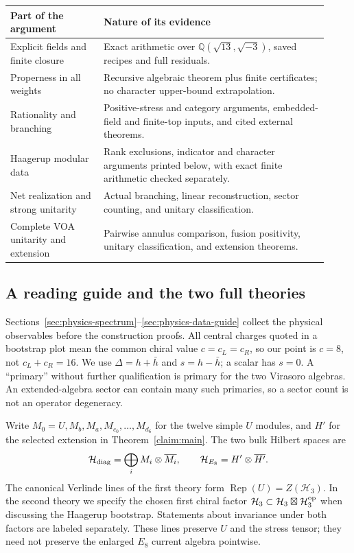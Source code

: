 \documentclass[11pt,a4paper]{article}
\theoremstyle{definition}
\DeclareMathOperator{\Rep}{Rep}
\newcommand{\HH}{\mathcal H}
\newcommand{\QQ}{\mathbb Q}
\begin{document}
\begin{center}
\begin{tabular}{@{}p{0.27\linewidth}p{0.65\linewidth}@{}}
\toprule
Part of the argument & Nature of its evidence \\
\midrule
Explicit fields and finite closure & Exact arithmetic over
\(\QQ(\sqrt{13},\sqrt{-3})\), saved recipes and full residuals.\\
Properness in all weights & Recursive algebraic theorem plus finite
certificates; no character upper-bound extrapolation.\\
Rationality and branching & Positive-stress and category arguments,
embedded-field and finite-top inputs, and cited external theorems.\\
Haagerup modular data & Rank exclusions, indicator and character
arguments printed below, with exact finite arithmetic checked separately.\\
Net realization and strong unitarity & Actual branching, linear
reconstruction, sector counting, and unitary classification.\\
Complete VOA unitarity and extension & Pairwise annulus comparison,
fusion positivity, unitary classification, and extension theorems.\\
\bottomrule
\end{tabular}
\end{center}

\subsection{A reading guide and the two full theories}
Sections~\ref{sec:physics-spectrum}--\ref{sec:physics-data-guide}
collect the physical observables before the construction proofs.
All central charges quoted in a bootstrap plot mean the common chiral
value $c=c_L=c_R$, so our point is $c=8$, not $c_L+c_R=16$.
We use $\Delta=h+\bar h$ and $s=h-\bar h$; a scalar has $s=0$.
A ``primary'' without further qualification is primary for the two
Virasoro algebras. An extended-algebra sector can contain many such
primaries, so a sector count is not an operator degeneracy.

Write $M_0=U,M_b,M_a,M_{c_0},\ldots,M_{d_6}$ for the twelve simple
$U$ modules, and $H'$ for the selected extension in Theorem~\ref{claim:main}.
The two bulk Hilbert spaces are
\begin{equation}\label{eq:physics-two-theories}
 \mathcal H_{\rm diag}=\bigoplus_i M_i\otimes\overline{M_i},
 \qquad
 \mathcal H_{E_8}=H'\otimes\overline{H'}.
\end{equation}
The canonical Verlinde lines of the first theory form
$\Rep(U)=Z(\HH_3)$. In the second theory we specify the chosen first
chiral factor $\HH_3\subset\HH_3\boxtimes\HH_3^{\rm op}$ when discussing
the Haagerup bootstrap. Statements about invariance under both factors
are labeled separately. These lines preserve $U$ and the stress tensor;
they need not preserve the enlarged $E_8$ current algebra pointwise.
\end{document}
